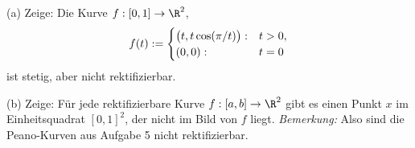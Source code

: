 \begin{prob}
(a) Zeige: Die Kurve $f:[0,1]\to\R^2$,
$$
   f(t) := \begin{cases}\bigl(t,t\cos(\pi/t)\bigr): &t>0, \cr (0,0):
   &t=0 \end{cases}
$$
ist stetig, aber nicht rektifizierbar.

(b) Zeige: F\"ur jede rektifizierbare Kurve $f:[a,b]\to\R^2$ gibt es
einen Punkt $x$ im Einheitsquadrat $[0,1]^2$, der nicht im Bild von
$f$ liegt. {\it Bemerkung: }Also sind die Peano-Kurven aus Aufgabe 5
nicht rektifizierbar.   
\end{prob}
